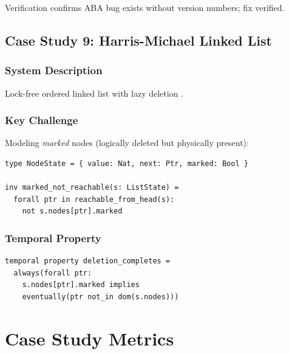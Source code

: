 \documentclass[conference]{IEEEtran}
\begin{document}
Verification confirms ABA bug exists without version numbers; fix verified.

\subsection{Case Study 9: Harris-Michael Linked List}

\subsubsection{System Description}

Lock-free ordered linked list with lazy deletion \cite{harris2001}.

\subsubsection{Key Challenge}

Modeling \textit{marked} nodes (logically deleted but physically present):

\begin{lstlisting}
type NodeState = { value: Nat, next: Ptr, marked: Bool }

inv marked_not_reachable(s: ListState) =
  forall ptr in reachable_from_head(s):
    not s.nodes[ptr].marked
\end{lstlisting}

\subsubsection{Temporal Property}

\begin{lstlisting}
temporal property deletion_completes =
  always(forall ptr:
    s.nodes[ptr].marked implies
    eventually(ptr not_in dom(s.nodes)))
\end{lstlisting}

\section{Case Study Metrics}
\end{document}
